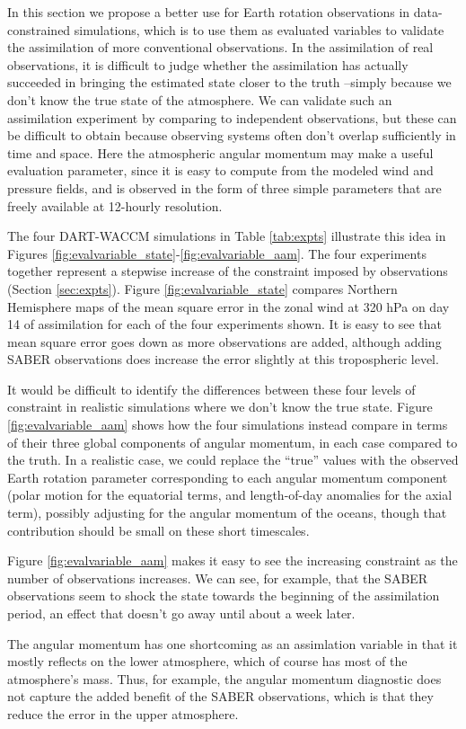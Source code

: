 In this section we propose a better use for Earth rotation observations in data-constrained simulations, which is to use them as evaluated variables to validate the assimilation of more conventional observations.  
In the assimilation of real observations, it is difficult to judge whether the assimilation has actually succeeded in bringing the estimated state closer to the truth --simply because we don't know the true state of the atmosphere.
We can validate such an assimilation experiment by comparing to independent observations, but these can be difficult to obtain because observing systems often don't overlap sufficiently in time and space.
Here the atmospheric angular momentum may make a useful evaluation parameter, since it is easy to compute from the modeled wind and pressure fields, and is observed in the form of three simple parameters that are freely available at 12-hourly resolution.  

The four DART-WACCM simulations in Table \ref{tab:expts} illustrate this idea in Figures \ref{fig:evalvariable_state}-\ref{fig:evalvariable_aam}. 
The four experiments together represent a stepwise increase of the constraint imposed by observations (Section \ref{sec:expts}).  
Figure \ref{fig:evalvariable_state} compares Northern Hemisphere maps of the mean square error in the zonal wind at 320 hPa on day 14 of assimilation for each of the four experiments shown.
It is easy to see that mean square error goes down as more observations are added, although adding SABER observations does increase the error slightly at this tropospheric level. 

It would be difficult to identify the differences between these four levels of constraint in realistic simulations where we don't know the true state. 
Figure \ref{fig:evalvariable_aam} shows how the four simulations instead compare in terms of their three global components of angular momentum, in each case compared to the truth.  
In a realistic case, we could replace the ``true'' values with the observed Earth rotation parameter corresponding to each angular momentum component (polar motion for the equatorial terms, and length-of-day anomalies for the axial term), possibly adjusting for the angular momentum of the oceans, though that contribution should be small on these short timescales.  

Figure  \ref{fig:evalvariable_aam} makes it easy to see the increasing constraint as the number of observations increases.
We can see, for example, that the SABER observations seem to shock the state towards the beginning of the assimilation period, an effect that doesn't go away until about a week later.  

The angular momentum has one shortcoming as an assimlation variable in that it mostly reflects on the lower atmosphere, which of course has most of the atmosphere's mass.
Thus, for example, the angular momentum diagnostic does not capture the added benefit of the SABER observations, which is that they reduce the error in the upper atmosphere. 
